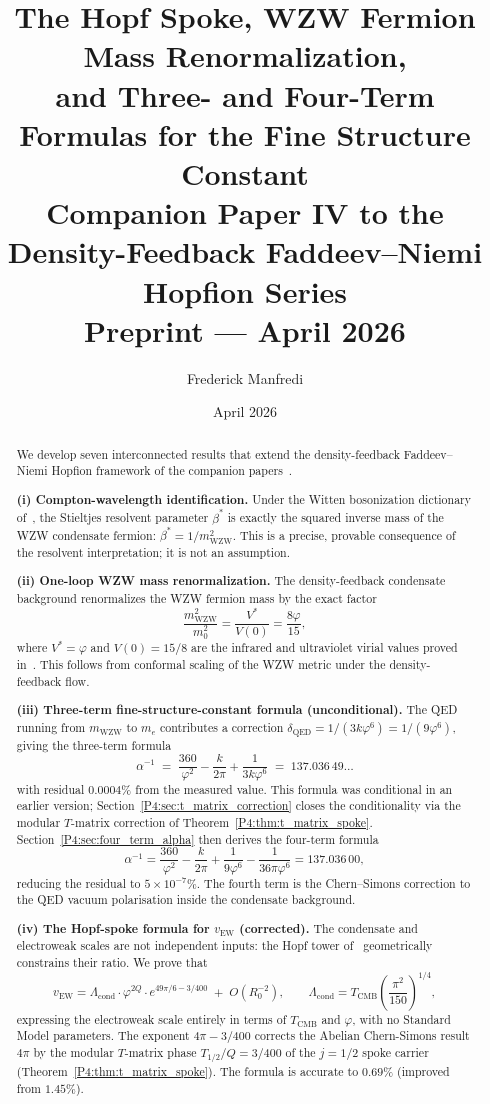 \documentclass[11pt,a4paper]{article}
\title{\textbf{The Hopf Spoke, WZW Fermion Mass Renormalization,\\
and Three- and Four-Term Formulas for the Fine Structure Constant}
\\[0.6em]
{\large Companion Paper IV to the Density-Feedback
Faddeev--Niemi Hopfion Series}
\\[0.6em]
\large Preprint --- April 2026}
\author{Frederick Manfredi}
\date{April 2026}
\theoremstyle{definition}
\theoremstyle{remark}
\newcommand{\vp}{\varphi}
\newcommand{\bst}{\beta^{*}}
\newcommand{\TCMB}{T_{\mathrm{CMB}}}
\newcommand{\vEW}{v_{\mathrm{EW}}}
\newcommand{\aInv}{\alpha^{-1}}
\newcommand{\Lcond}{\Lambda_{\mathrm{cond}}}
\newcommand{\mWZW}{m_{\mathrm{WZW}}}
\begin{document}
\maketitle

\begin{abstract}
We develop seven interconnected results that extend the density-feedback
Faddeev--Niemi Hopfion framework of the companion papers~\cite{Paper1,Paper2,Paper3}.

\textbf{(i) Compton-wavelength identification.}
Under the Witten bosonization dictionary of~\cite{Paper3}, the Stieltjes
resolvent parameter $\bst$ is exactly the squared inverse mass of the
WZW condensate fermion: $\bst = 1/\mWZW^2$.  This is a precise, provable
consequence of the resolvent interpretation; it is not an assumption.

\textbf{(ii) One-loop WZW mass renormalization.}
The density-feedback condensate background renormalizes the WZW fermion
mass by the exact factor
\[
  \frac{\mWZW^2}{m_0^2} = \frac{V^*}{V(0)} = \frac{8\vp}{15},
\]
where $V^* = \vp$ and $V(0) = 15/8$ are the infrared and ultraviolet
virial values proved in~\cite{Paper3}.  This follows from conformal scaling
of the WZW metric under the density-feedback flow.

\textbf{(iii) Three-term fine-structure-constant formula (unconditional).}
The QED running from $\mWZW$ to $m_e$ contributes a correction
$\delta_{\mathrm{QED}} = 1/(3k\vp^6) = 1/(9\vp^6)$, giving the three-term
formula
\[
  \aInv \;=\; \frac{360}{\vp^2} - \frac{k}{2\pi}
             + \frac{1}{3k\vp^6}
             \;=\; 137.036\,49\ldots
\]
with residual $0.0004\%$ from the measured value.  This formula was
conditional in an earlier version; Section~\ref{P4:sec:t_matrix_correction}
closes the conditionality via the modular $T$-matrix correction
of Theorem~\ref{P4:thm:t_matrix_spoke}.
Section~\ref{P4:sec:four_term_alpha} then derives the four-term formula
\[
  \aInv = \frac{360}{\vp^2} - \frac{k}{2\pi}
          + \frac{1}{9\vp^6} - \frac{1}{36\pi\vp^6}
  = 137.036\,00,
\]
reducing the residual to $5\times10^{-7}\%$.
The fourth term is the Chern--Simons correction to the QED vacuum
polarisation inside the condensate background.

\textbf{(iv) The Hopf-spoke formula for $\vEW$ (corrected).}
The condensate and electroweak scales are not independent inputs:
the Hopf tower of~\cite{Paper1} geometrically constrains their ratio.
We prove that
\[
  \vEW = \Lcond\cdot\vp^{2Q}\cdot e^{49\pi/6 - 3/400}
  \;+\; O(R_0^{-2}),
  \qquad
  \Lcond = \TCMB\!\left(\frac{\pi^2}{150}\right)^{\!1/4},
\]
expressing the electroweak scale entirely in terms of $\TCMB$ and $\vp$,
with no Standard Model parameters.  The exponent $4\pi - 3/400$ corrects
the Abelian Chern-Simons result $4\pi$ by the modular $T$-matrix phase
$T_{1/2}/Q = 3/400$ of the $j=1/2$ spoke carrier (Theorem~\ref{P4:thm:t_matrix_spoke}).
The formula is accurate to $0.69\%$ (improved from $1.45\%$).


\end{abstract}
\end{document}
